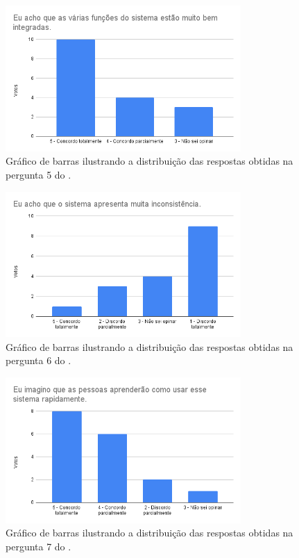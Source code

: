 \documentclass[12pt]{tcc}
\begin{document}
	\begin{figure}[!ht]
		\centering
		\includegraphics[width=0.8\textwidth]{figures/respostas-pergunta-5.png}
		\caption[Respostas obtidas na pergunta 5 do formulário de avaliação]{Gráfico de barras ilustrando a distribuição das respostas obtidas na pergunta 5 do .}
		\label{fig:respostas-pergunta-5}
	\end{figure}

	\begin{figure}[!ht]
		\centering
		\includegraphics[width=0.8\textwidth]{figures/respostas-pergunta-6.png}
		\caption[Respostas obtidas na pergunta 6 do formulário de avaliação]{Gráfico de barras ilustrando a distribuição das respostas obtidas na pergunta 6 do .}
		\label{fig:respostas-pergunta-6}
	\end{figure}

	\begin{figure}[!ht]
		\centering
		\includegraphics[width=0.8\textwidth]{figures/respostas-pergunta-7.png}
		\caption[Respostas obtidas na pergunta 7 do formulário de avaliação]{Gráfico de barras ilustrando a distribuição das respostas obtidas na pergunta 7 do .}
		\label{fig:respostas-pergunta-7}
	\end{figure}
\end{document}
